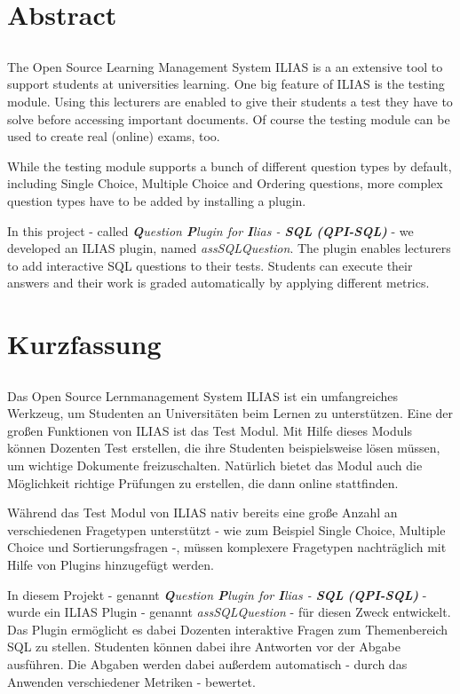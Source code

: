 \chapter*{Abstract}
\section*{\thesistitleGB}

The Open Source Learning Management System ILIAS is a an extensive tool to support students at universities learning. One big feature of ILIAS is the testing module. Using this lecturers are enabled to give their students a test they have to solve before accessing important documents. Of course the testing module can be used to create real (online) exams, too.

While the testing module supports a bunch of different question types by default, including Single Choice, Multiple Choice and Ordering questions, more complex question types have to be added by installing a plugin.

In this project - called \textit{\textbf{Q}uestion \textbf{P}lugin for \textbf{I}lias - \textbf{SQL} \textbf{(QPI-SQL)}} - we developed an ILIAS plugin, named \textit{assSQLQuestion}. The plugin enables lecturers to add interactive SQL questions to their tests. Students can execute their answers and their work is graded automatically by applying different metrics.
 
\clearpage{\pagestyle{empty}\cleardoublepage}
\chapter*{Kurzfassung}
\section*{\thesistitle}

Das Open Source Lernmanagement System ILIAS ist ein umfangreiches Werkzeug, um Studenten an Universitäten beim Lernen zu unterstützen. Eine der großen Funktionen von ILIAS ist das Test Modul. Mit Hilfe dieses Moduls können Dozenten Test erstellen, die ihre Studenten beispielsweise lösen müssen, um wichtige Dokumente freizuschalten. Natürlich bietet das Modul auch die Möglichkeit richtige Prüfungen zu erstellen, die dann online stattfinden.

Während das Test Modul von ILIAS nativ bereits eine große Anzahl an verschiedenen Fragetypen unterstützt - wie zum Beispiel Single Choice, Multiple Choice und Sortierungsfragen -, müssen komplexere Fragetypen nachträglich mit Hilfe von Plugins hinzugefügt werden.

In diesem Projekt - genannt \textit{\textbf{Q}uestion \textbf{P}lugin for \textbf{I}lias - \textbf{SQL} \textbf{(QPI-SQL)}} - wurde ein ILIAS Plugin - genannt \textit{assSQLQuestion} - für diesen Zweck entwickelt. Das Plugin ermöglicht es dabei Dozenten interaktive Fragen zum Themenbereich SQL zu stellen. Studenten können dabei ihre Antworten vor der Abgabe ausführen. Die Abgaben werden dabei außerdem automatisch - durch das Anwenden verschiedener Metriken - bewertet.
